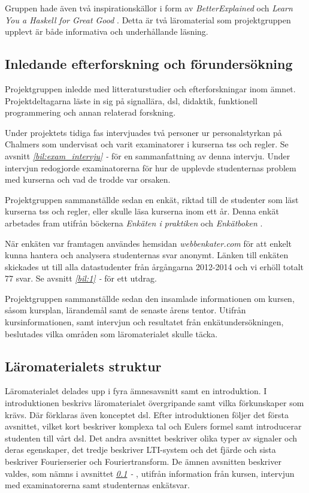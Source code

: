 \documentclass[12pt,a4paper,twoside,openright]{article}
\begin{document}
Gruppen hade även två inspirationskällor i form av
\textit{BetterExplained} \cite{betterexplained} och \textit{Learn You
  a Haskell for Great Good} \cite{learnyouahaskell}. Detta är två
läromaterial som projektgruppen upplevt är både informativa och
underhållande läsning.

\subsection{Inledande efterforskning och förundersökning}
\label{sec:efterforskning}

Projektgruppen inledde med litteraturstudier och efterforskningar inom
ämnet. Projektdeltagarna läste in sig på signallära, \gls{dsl}, didaktik,
funktionell programmering och annan relaterad forskning.

Under projektets tidiga fas intervjuades två personer ur
personalstyrkan på Chalmers som undervisat och varit examinatorer i
kurserna \gls{tss} och \gls{regler}. Se avsnitt
\textit{\ref{bil:exam_intervju} - } för en
sammanfattning av denna intervju. Under intervjun redogjorde
examinatorerna för hur de upplevde studenternas problem med kurserna
och vad de trodde var orsaken.

Projektgruppen sammanställde sedan en enkät, riktad till de studenter
som läst kurserna \gls{tss} och \gls{regler}, eller skulle
läsa kurserna inom ett år. Denna enkät arbetades fram utifrån böckerna
\textit{Enkäten i praktiken} \cite{enkaten_i_praktiken} och
\textit{Enkätboken} \cite{enkatboken}.

När enkäten var framtagen användes hemsidan \textit{webbenkater.com}
för att enkelt kunna hantera och analysera studenternas svar anonymt.
Länken till enkäten skickades ut till alla datastudenter från
årgångarna 2012-2014 och vi erhöll totalt 77 svar. Se avsnitt
\textit{\ref{bil:1} - } för ett utdrag.

Projektgruppen sammanställde sedan den insamlade informationen om
kursen, såsom kursplan, lärandemål samt de senaste årens
tentor. Utifrån kursinformationen, samt intervjun och resultatet från
enkätundersökningen, beslutades vilka områden som läromaterialet
skulle täcka.

\subsection{Läromaterialets struktur}
\label{sec:struktur}
Läromaterialet delades upp i fyra ämnesavsnitt samt en introduktion. I
introduktionen beskrivs läromaterialet övergripande samt vilka
förkunskaper som krävs. Där förklaras även konceptet \gls{dsl}. Efter
introduktionen följer det första avsnittet, vilket kort beskriver
komplexa tal och Eulers formel samt introducerar studenten till vårt
\gls{dsl}. Det andra avsnittet beskriver olika typer av signaler och deras
egenskaper, det tredje beskriver LTI-system och det fjärde och sista
beskriver Fourierserier och Fouriertransform. De ämnen avsnitten
beskriver valdes, som nämns i avsnittet
\textit{\ref{sec:efterforskning} - },
utifrån information från kursen, intervjun med examinatorerna samt
studenternas enkätsvar.
\end{document}
